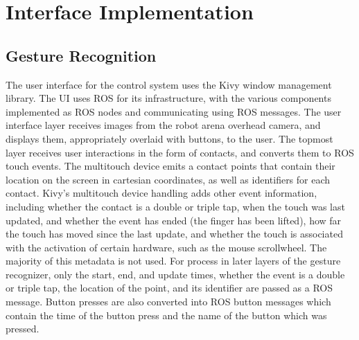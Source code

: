 \chapter{Interface Implementation}
\thispagestyle{fancy}

\section{Gesture Recognition}

The user interface for the control system uses the Kivy window management library. 
The UI uses ROS for its infrastructure, with the various components implemented as ROS nodes and communicating using ROS messages.
The user interface layer receives images from the robot arena overhead camera, and displays them, appropriately overlaid with buttons, to the user. 
The topmost layer receives user interactions in the form of contacts, and converts them to ROS touch events. The multitouch device emits a contact points that contain their location on the screen in cartesian coordinates, as well as identifiers for each contact.
Kivy's multitouch device handling adds other event information, including whether the contact is a double or triple tap, when the touch was last updated, and whether the event has ended (the finger has been lifted), how far the touch has moved since the last update, and whether the touch is associated with the activation of certain hardware, such as the mouse scrollwheel.
The majority of this metadata is not used. 
For process in later layers of the gesture recognizer, only the start, end, and update times, whether the event is a double or triple tap, the location of the point, and its identifier are passed as a ROS message. 
Button presses are also converted into ROS button messages which contain the time of the button press and the name of the button which was pressed. 

